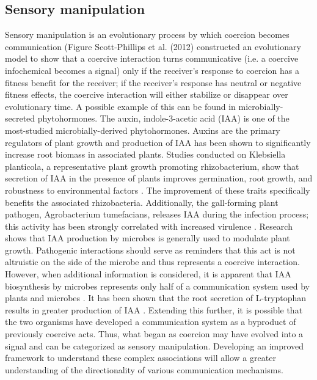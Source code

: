 \documentclass[PhD]{msu-thesis}
\begin{document}
\subsection{Sensory manipulation} 
Sensory manipulation is an evolutionary process by which coercion becomes communication (Figure Scott-Phillips et al. (2012) constructed an evolutionary model to show that a coercive interaction turns communicative (i.e. a coercive infochemical becomes a signal) only if the receiver’s response to coercion has a fitness benefit for the receiver; if the receiver’s response has neutral or negative fitness effects, the coercive interaction will either stabilize or disappear over evolutionary time. 
A possible example of this can be found in microbially-secreted phytohormones. The auxin, indole-3-acetic acid (IAA) is one of the most-studied microbially-derived phytohormones. Auxins are the primary regulators of plant growth and production of IAA has been shown to significantly increase root biomass in associated plants. Studies conducted on Klebsiella planticola, a representative plant growth promoting rhizobacterium, show that secretion of IAA in the presence of plants improves germination, root growth, and robustness to environmental factors \cite{blinkov2014}. The improvement of these traits specifically benefits the associated rhizobacteria. Additionally, the gall-forming plant pathogen, Agrobacterium tumefacians, releases IAA during the infection process; this activity has been strongly correlated with increased virulence \cite{morris1986}. Research shows that IAA production by microbes is generally used to modulate plant growth. Pathogenic interactions should serve as reminders that this act is not altruistic on the side of the microbe and thus represents a coercive interaction. However, when additional information is considered, it is apparent that IAA biosynthesis by microbes represents only half of a communication system used by plants and microbes \cite{lambrecht2000}. It has been shown that the root secretion of L-tryptophan results in greater production of IAA \cite{karnwal2009}. Extending this further, it is possible that the two organisms have developed a communication system as a byproduct of previously coercive acts. Thus, what began as coercion may have evolved into a signal and can be categorized as sensory manipulation. Developing an improved framework to understand these complex associations will allow a greater understanding of the directionality of various communication mechanisms. 
\end{document}
